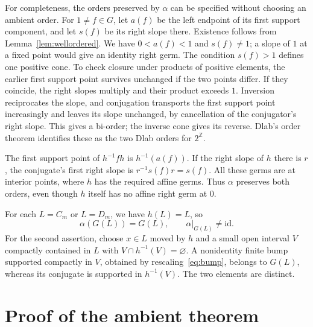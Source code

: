 \documentclass[10pt]{article}
\theoremstyle{definition}
\newcommand{\Z}{\mathbb Z}
\newcommand{\id}{\mathrm{id}}
\begin{document}
For completeness, the orders preserved by $\alpha$ can be specified
without choosing an ambient order. For $1\ne f\in G$, let $a(f)$
be the left endpoint of its first support component, and let $s(f)$
be its right slope there. Existence follows from
Lemma~\ref{lem:wellordered}. We have $0<a(f)<1$ and $s(f)\ne1$;
a slope of $1$ at a fixed point would give an identity right germ.
The condition $s(f)>1$ defines one positive cone. To check closure
under products of positive elements, the earlier first support point
survives unchanged if the two points differ. If they coincide, the
right slopes multiply and their product exceeds $1$. Inversion
reciprocates the slope, and conjugation transports the first support
point increasingly and leaves its slope unchanged, by cancellation
of the conjugator's right slope. This gives a bi-order; the inverse
cone gives its reverse. Dlab's order theorem
\cite[Theorem~4.1]{Dlab} identifies these as the two Dlab orders for
$2^{\Z}$.

The first support point of $h^{-1}fh$ is $h^{-1}(a(f))$. If the
right slope of $h$ there is $r$, the conjugate's first right slope is
$r^{-1}s(f)r=s(f)$. All these germs are at interior points, where
$h$ has the required affine germs. Thus $\alpha$ preserves both
orders, even though $h$ itself has no affine right germ at $0$.

For each $L=C_m$ or $L=D_m$, we have $h(L)=L$, so
\begin{equation}\label{eq:localalpha}
 \alpha(G(L))=G(L),\qquad \alpha|_{G(L)}\ne\id.
\end{equation}
For the second assertion, choose $x\in L$ moved by $h$ and a small
open interval $V$ compactly contained in $L$ with
$V\cap h^{-1}(V)=\varnothing$. A nonidentity finite bump supported
compactly in $V$, obtained by rescaling~\eqref{eq:bump}, belongs to
$G(L)$, whereas its conjugate is supported in $h^{-1}(V)$.
The two elements are distinct.

\section{Proof of the ambient theorem}
\end{document}
